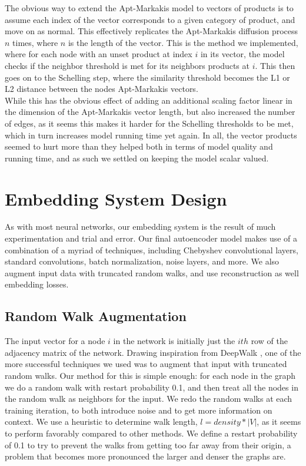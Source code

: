 \documentclass[12pt,twoside]{report}
\begin{document}
The obvious way to extend the Apt-Markakis model to vectors of products is to assume each index of the vector corresponds to a given category of product, and move on as normal. This effectively replicates the Apt-Markakis diffusion process $n$ times, where $n$ is the length of the vector. This is the method we implemented, where for each node with an unset product at index $i$ in its vector, the model checks if the neighbor threshold is met for its neighbors products at $i$. This then goes on to the Schelling step, where the similarity threshold becomes the L1 or L2 distance between the nodes Apt-Markakis vectors. \\

While this has the obvious effect of adding an additional scaling factor linear in the dimension of the Apt-Markakis vector length, but also increased the number of edges, as it seems this makes it harder for the Schelling thresholds to be met, which in turn increases model running time yet again. In all, the vector products seemed to hurt more than they helped both in terms of model quality and running time, and as such we settled on keeping the model scalar valued. \\

\section{Embedding System Design}

As with most neural networks, our embedding system is the result of much experimentation and trial and error. Our final autoencoder model makes use of a combination of a myriad of techniques, including Chebyshev convolutional layers, standard convolutions, batch normalization, noise layers, and more. We also augment input data with truncated random walks, and use reconstruction as well embedding losses. \\

\subsection{Random Walk Augmentation}

The input vector for a node $i$ in the network is initially just the $ith$ row of the adjacency matrix of the network. Drawing inspiration from DeepWalk \cite{perozzi2014deepwalk}, one of the more successful techniques we used was to augment that input with truncated random walks. Our method for this is simple enough: for each node in the graph we do a random walk with restart probability 0.1, and then treat all the nodes in the random walk as neighbors for the input. We redo the random walks at each training iteration, to both introduce noise and to get more information on context. We use a heuristic to determine walk length, $l = density * |V|$, as it seems to perform favorably compared to other methods. We define a restart probability of 0.1 to try to prevent the walks from getting too far away from their origin, a problem that becomes more pronounced the larger and denser the graphs are. \\
\end{document}
